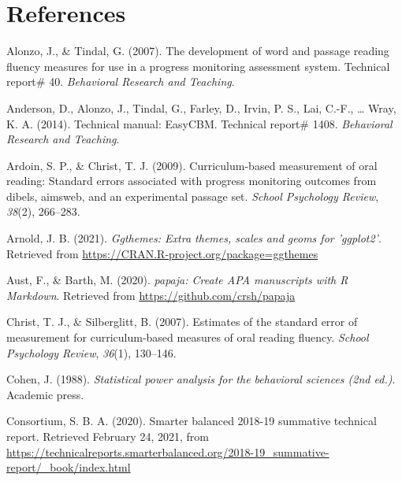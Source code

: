 \documentclass[
  english,
  man, fleqn, noextraspace]{apa6}
\begin{document}
\newpage

\hypertarget{references}{%
\section{References}\label{references}}

\begingroup
\setlength{\parindent}{-0.5in}
\setlength{\leftskip}{0.5in}

\hypertarget{refs}{}
\leavevmode\hypertarget{ref-alonzotindal2007}{}%
Alonzo, J., \& Tindal, G. (2007). The development of word and passage reading fluency measures for use in a progress monitoring assessment system. Technical report\# 40. \emph{Behavioral Research and Teaching}.

\leavevmode\hypertarget{ref-anderson2014tech}{}%
Anderson, D., Alonzo, J., Tindal, G., Farley, D., Irvin, P. S., Lai, C.-F., \ldots{} Wray, K. A. (2014). Technical manual: EasyCBM. Technical report\# 1408. \emph{Behavioral Research and Teaching}.

\leavevmode\hypertarget{ref-ardoin2009}{}%
Ardoin, S. P., \& Christ, T. J. (2009). Curriculum-based measurement of oral reading: Standard errors associated with progress monitoring outcomes from dibels, aimsweb, and an experimental passage set. \emph{School Psychology Review}, \emph{38}(2), 266--283.

\leavevmode\hypertarget{ref-R-ggthemes}{}%
Arnold, J. B. (2021). \emph{Ggthemes: Extra themes, scales and geoms for 'ggplot2'}. Retrieved from \url{https://CRAN.R-project.org/package=ggthemes}

\leavevmode\hypertarget{ref-R-papaja}{}%
Aust, F., \& Barth, M. (2020). \emph{papaja: Create APA manuscripts with R Markdown}. Retrieved from \url{https://github.com/crsh/papaja}

\leavevmode\hypertarget{ref-christ2007}{}%
Christ, T. J., \& Silberglitt, B. (2007). Estimates of the standard error of measurement for curriculum-based measures of oral reading fluency. \emph{School Psychology Review}, \emph{36}(1), 130--146.

\leavevmode\hypertarget{ref-cohen1988}{}%
Cohen, J. (1988). \emph{Statistical power analysis for the behavioral sciences (2nd ed.)}. Academic press.

\leavevmode\hypertarget{ref-sbac}{}%
Consortium, S. B. A. (2020). Smarter balanced 2018-19 summative technical report. Retrieved February 24, 2021, from \url{https://technicalreports.smarterbalanced.org/2018-19_summative-report/_book/index.html}
\end{document}
